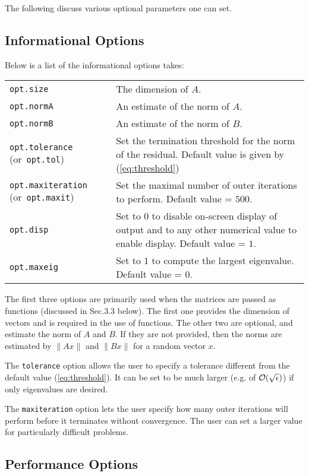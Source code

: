 \documentclass[acmtoms]{acmtrans2m}
\begin{document}
The following discuss various optional parameters  one can set.

\subsection{Informational Options}
Below is a list of the informational options \eigifp takes:

\medskip 

\begin{tabular}{p{1.5in}p{3in}}
{\tt opt.size} & The dimension of $A$.\\
{\tt opt.normA} & An estimate of the norm of $A$.\\
{\tt opt.normB} & An estimate of the norm of $B$.\\
{\tt opt.tolerance} 
\mbox{(or {\tt opt.tol})} & Set  the termination threshold for the 
        norm of the residual. Default value is given by (\ref{eq:threshold}) \\
{\tt opt.maxiteration} \mbox{(or {\tt opt.maxit})}
& Set the maximal number of outer iterations to perform. 
Default value = $500$. \\
{\tt opt.disp}  
& Set to $0$ to disable on-screen display of output and to any other numerical
value to enable display. 
Default value = $1$. \\
{\tt opt.maxeig}&Set to $1$ to compute the largest eigenvalue. 
Default value = $0$. 
\end{tabular}

The first three options are primarily used when the matrices are passed as functions (discussed in Sec.3.3 below). 
The first one provides the dimension of
vectors and is required in the use of functions. 
The other two are optional, and estimate
the norm of   $A$ and $B$. If they are not provided, then the norms are estimated by $\|Ax\|$ and $\|Bx\|$ for a random vector $x$. 

The {\tt tolerance} option allows the user to specify a tolerance 
different from the default value (\ref{eq:threshold}). 
It can be set to be much larger
(e.g. of ${\cal O} (\sqrt{\epsilon})$) if only eigenvalues are desired.  

The {\tt maxiteration} option lets the user specify how many outer iterations \eigifp will perform before it
terminates without convergence. The user can set a larger value 
for particularly difficult problems. 



\subsection{Performance Options}
\end{document}
